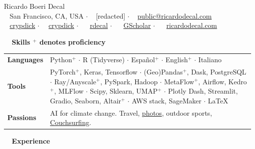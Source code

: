 \documentclass[a4paper,12pt]{article}
\newcommand{\resheading}[1]{{\vspace*{.001in} \colorbox{mygrey}{\begin{minipage}{\textwidth}{\textmd{\large \textbf{#1} \vphantom{p\^{E}}}}\end{minipage}}} }
\newcommand{\ressubheading}[4]{
    \textbf{#1} \hfill #2\\
    \textit{#3} \hfill #4 \\}
\begin{document}
    \begin{center}
    {\Huge Ricardo Boeri Decal}
        \\
        {\small \faMapMarker~ San Francisco, CA, USA $\cdot$ \faPhone~ [redacted] $\cdot$ \faEnvelope~ \href{mailto:public@ricardodecal.com}{public@ricardodecal.com}  \\ \faGithubAlt~ \href{https://github.com/crypdick}{crypdick} $\cdot$~\faStackOverflow~  \href{https://stackoverflow.com/users/4212158/crypdick}{crypdick} $\cdot$ ~\faLinkedin~ \href{https://www.linkedin.com/in/rdecal/}{rdecal} $\cdot$ ~\faGraduationCap~ \href{https://scholar.google.com/citations?user=4ODJ78oAAAAJ}{GScholar}  $\cdot$ ~\faHome~  \href{http://www.ricardodecal.com}{ricardodecal.com}}
    \end{center}

    \resheading{~~Skills \hfill {\small$^+$ denotes proficiency}}
    \vspace{-1em}
    \begin{tabularx}{\textwidth}{p{2.1cm}>{\arraybackslash}X}
        \bfseries{Languages} & Python$^+$ $\cdot$ R (Tidyverse) $\cdot$ Espa\~nol$^+$ $\cdot$ English$^+$ $\cdot$ Italiano                                                                                                                                                                                                   \\
        \bfseries{Tools}     & PyTorch$^+$, Keras, Tensorflow  $\cdot$ (Geo)Pandas$^+$, Dask, PostgreSQL $\cdot$ Ray/Anyscale$^+$, PySpark, Hadoop $\cdot$ MetaFlow$^+$, Airflow, Kedro$^+$, MLFlow $\cdot$ Scipy, Sklearn, UMAP$^+$ $\cdot$ Plotly Dash, Streamlit, Gradio, Seaborn, Altair$^+$  $\cdot$ AWS stack, SageMaker $\cdot$  \LaTeX \\
        \bfseries{Passions}  & AI for climate change. Travel, \href{https://www.flickr.com/photos/richarddecal/sets/72157640025469005/}{photos}, outdoor sports, \href{https://www.couchsurfing.com/people/rovingrichard/references}{Couchsurfing}.
    \end{tabularx}


    \resheading{~~Experience}
    \vspace{-1em}
\end{document}
